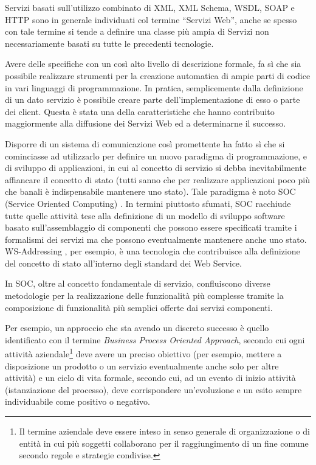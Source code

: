 Servizi basati sull'utilizzo combinato di XML, XML Schema, WSDL, SOAP e HTTP
sono in generale individuati col termine ``Servizi Web'', anche se spesso con
tale termine si tende a definire una classe più ampia di Servizi non necessariamente basati su tutte le
precedenti tecnologie.

Avere delle specifiche con un così alto livello di descrizione formale, fa sì
che sia possibile realizzare strumenti per la creazione
automatica di ampie parti di codice in vari linguaggi di programmazione. In
pratica, semplicemente dalla definizione di un dato servizio è possibile creare
parte dell'implementazione di esso o parte dei client. Questa è stata una della
caratteristiche che hanno contribuito maggiormente alla diffusione dei Servizi
Web ed a determinarne il successo.

Disporre di un sistema di comunicazione così promettente ha fatto sì che si
cominciasse ad utilizzarlo per definire un nuovo paradigma di programmazione, 
e di sviluppo di applicazioni, in cui al concetto di servizio si debba
inevitabilmente affiancare il concetto di stato (tutti sanno che per
realizzare applicazioni poco più che banali è indispensabile mantenere uno
stato). Tale paradigma è noto SOC (Service Oriented Computing) \cite{SOC1}
\cite{WEBSERVICES}. In termini piuttosto sfumati, SOC racchiude tutte quelle attività tese alla
definizione di un modello di sviluppo software basato sull'assemblaggio di componenti che possono essere
specificati tramite i formalismi dei servizi ma che possono eventualmente
mantenere anche uno stato. WS-Addressing \cite{WS-Addressing}, per esempio, è
una tecnologia che contribuisce alla definizione del concetto di stato all'interno degli standard
dei Web Service.

In SOC, oltre al concetto fondamentale di servizio, confluiscono diverse
metodologie per la realizzazione delle funzionalità più complesse tramite la
composizione di funzionalità più semplici offerte dai servizi componenti.

Per esempio, un approccio che sta avendo un discreto successo è quello
identificato con il termine \emph{Business Process Oriented Approach}, secondo
cui ogni attività aziendale\footnote{Il termine aziendale deve essere inteso in
senso generale di organizzazione o di entità in cui più soggetti collaborano
per il raggiungimento di un fine comune secondo regole e strategie condivise.} deve
avere un preciso obiettivo (per esempio, mettere a disposizione un prodotto o un
servizio eventualmente anche solo per altre attività) e un ciclo di vita
formale, secondo cui, ad un evento di inizio attività (istanziazione del
processo), deve corrispondere un'evoluzione e un esito sempre individuabile
come positivo o negativo.

